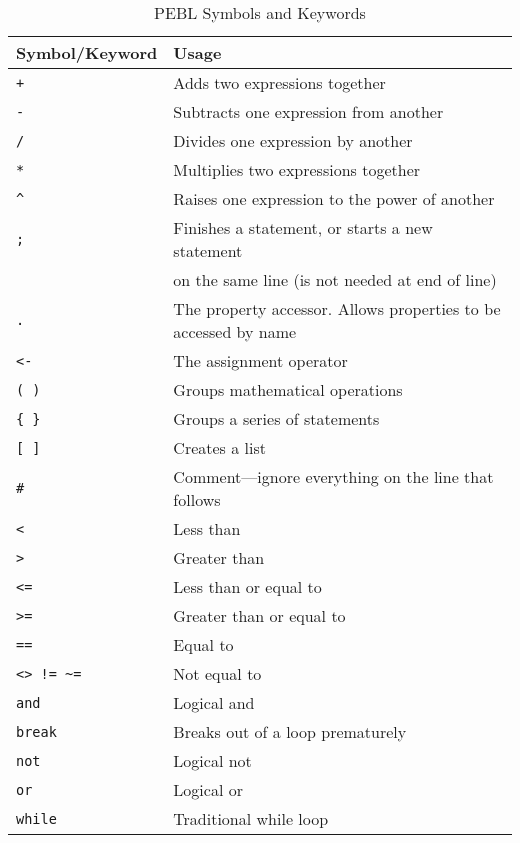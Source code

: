 \begin{table}[htbp]
\flushleft
\caption{PEBL Symbols and Keywords}
\begin{tabular}{ll}
\toprule
\textbf{Symbol/Keyword}& \textbf{Usage}\\
\midrule
\verb-+-  &                  Adds two expressions together\\
\verb+-+  &                  Subtracts one expression from another\\
\verb+/+  &                  Divides one expression by another\\
\verb+*+  &                  Multiplies two expressions together\\
\verb+^+  &                  Raises one expression  to the power of another\\
\verb+;+  &                  Finishes a statement, or starts a new statement\\              &                  
on the same line (is not needed at end of line)\\
\verb+.+ &                   The property accessor.  Allows properties
to be accessed by name\\
\verb+<-+  &                 The assignment operator\\
\verb+( )+ &                 Groups mathematical operations\\
\verb+{ }+ &                 Groups a series of statements\\
\verb+[ ]+ &                 Creates a list\\
\verb+#+   &                 Comment---ignore everything on the line that follows\\
\verb+<+   &                 Less than\\
\verb+>+   &                 Greater than\\
\verb+<=+  &                 Less than or equal to\\
\verb+>=+  &                 Greater than or equal to\\
\verb+==+  &                 Equal to\\
\verb+<> != ~=+&             Not equal to\\
\texttt{and}   &               Logical and\\
\texttt{break} &               Breaks out of a loop prematurely\\
\texttt{not}   &               Logical not\\
\texttt{or}    &               Logical or\\
\texttt{while} &               Traditional while loop\\

\end{tabular}
\end{table}
